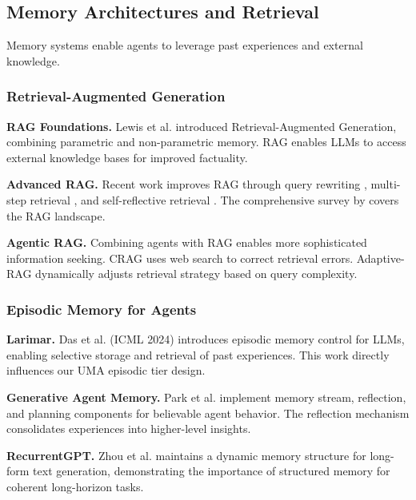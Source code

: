 \documentclass{article}
\theoremstyle{plain}
\theoremstyle{definition}
\theoremstyle{remark}
\begin{document}
\subsection{Memory Architectures and Retrieval}
\label{sec:related_memory}

Memory systems enable agents to leverage past experiences and external knowledge.

\subsubsection{Retrieval-Augmented Generation}

\textbf{RAG Foundations.} Lewis et al. \citep{lewis2020rag} introduced Retrieval-Augmented Generation, combining parametric and non-parametric memory. RAG enables LLMs to access external knowledge bases for improved factuality.

\textbf{Advanced RAG.} Recent work improves RAG through query rewriting \citep{ma2023query}, multi-step retrieval \citep{trivedi2023interleaving}, and self-reflective retrieval \citep{asai2023selfrag}. The comprehensive survey by \citet{gao2023rag} covers the RAG landscape.

\textbf{Agentic RAG.} Combining agents with RAG enables more sophisticated information seeking. CRAG \citep{yan2024corrective} uses web search to correct retrieval errors. Adaptive-RAG \citep{jeong2024adaptive} dynamically adjusts retrieval strategy based on query complexity.

\subsubsection{Episodic Memory for Agents}

\textbf{Larimar.} Das et al. \citep{das2024larimar} (ICML 2024) introduces episodic memory control for LLMs, enabling selective storage and retrieval of past experiences. This work directly influences our UMA episodic tier design.

\textbf{Generative Agent Memory.} Park et al. \citep{park2023generative} implement memory stream, reflection, and planning components for believable agent behavior. The reflection mechanism consolidates experiences into higher-level insights.

\textbf{RecurrentGPT.} Zhou et al. \citep{zhou2023recurrentgpt} maintains a dynamic memory structure for long-form text generation, demonstrating the importance of structured memory for coherent long-horizon tasks.
\end{document}
